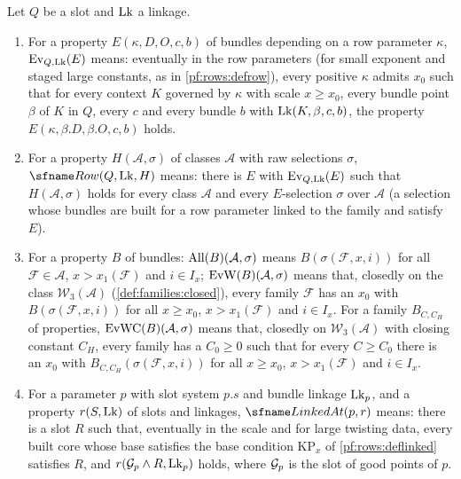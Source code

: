 \begin{definition}\label{pf:open0:def:rows}
Let $Q$ be a slot and $\mathrm{Lk}$ a linkage.
\begin{enumerate}[label=(\alph*)]
\item For a property $E(\kappa,D,O,c,b)$ of bundles depending on a row parameter $\kappa$, $\mathrm{Ev}_{Q,\mathrm{Lk}}(E)$
means: eventually in the row parameters (for small exponent and staged large constants, as in \cref{pf:rows:defrow}),
every positive $\kappa$ admits $x_0$ such that for every context $K$ governed by $\kappa$ with scale $x\ge x_0$, every
bundle point $\beta$ of $K$ in $Q$, every $c$ and every bundle $b$ with $\mathrm{Lk}(K,\beta,c,b)$, the property
$E(\kappa,\beta.D,\beta.O,c,b)$ holds.
\item For a property $H(\mathcal A,\sigma)$ of classes $\mathcal A$ with raw selections $\sigma$,
$\openzeroRow(Q,\openzeroLk,H)$ means: there is $E$ with $\mathrm{Ev}_{Q,\mathrm{Lk}}(E)$ such that $H(\mathcal A,\sigma)$
holds for every class $\mathcal A$ and every $E$-selection $\sigma$ over $\mathcal A$ (a selection whose bundles are
built for a row parameter linked to the family and satisfy $E$).
\item For a property $B$ of bundles: $\mathrm{All}(B)(\mathcal A,\sigma)$ means $B(\sigma(\mathcal F,x,i))$ for all
$\mathcal F\in\mathcal A$, $x>x_1(\mathcal F)$ and $i\in I_x$; $\mathrm{EvW}(B)(\mathcal A,\sigma)$ means that, closedly on
the class $\mathcal W_3(\mathcal A)$ (\cref{def:families:closed}), every family $\mathcal F$ has an $x_0$ with
$B(\sigma(\mathcal F,x,i))$ for all $x\ge x_0$, $x>x_1(\mathcal F)$ and $i\in I_x$. For a family $B_{C,C_H}$ of properties,
$\mathrm{EvWC}(B)(\mathcal A,\sigma)$ means that, closedly on $\mathcal W_3(\mathcal A)$ with closing constant $C_H$, every
family has a $C_0\ge0$ such that for every $C\ge C_0$ there is an $x_0$ with $B_{C,C_H}(\sigma(\mathcal F,x,i))$ for all
$x\ge x_0$, $x>x_1(\mathcal F)$ and $i\in I_x$.
\item For a parameter $p$ with slot system $p.s$ and bundle linkage $\mathrm{Lk}_p$, and a property $r(S,\mathrm{Lk})$ of
slots and linkages, $\openzeroLinked(p,r)$ means: there is a slot $R$ such that, eventually in the scale and for large
twisting data, every built core whose base satisfies the base condition $\mathrm{KP}_x$ of \cref{pf:rows:deflinked}
satisfies $R$, and $r(\mathcal{G}_p\wedge R,\mathrm{Lk}_p)$ holds, where $\mathcal{G}_p$ is the slot of good points
of $p$.
\end{enumerate}
\ \ \
\ \ 
\end{definition}

